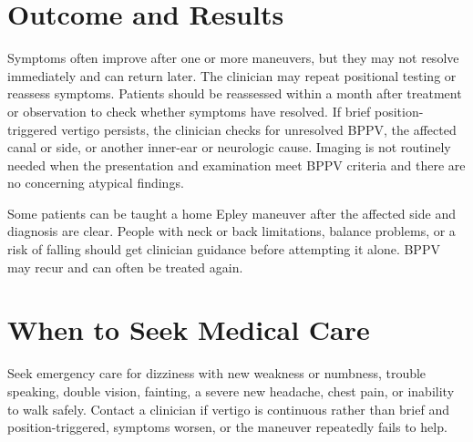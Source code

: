 \section*{Outcome and Results}
Symptoms often improve after one or more maneuvers, but they may not resolve immediately and can return later. The clinician may repeat positional testing or reassess symptoms. Patients should be reassessed within a month after treatment or observation to check whether symptoms have resolved. If brief position-triggered vertigo persists, the clinician checks for unresolved BPPV, the affected canal or side, or another inner-ear or neurologic cause. Imaging is not routinely needed when the presentation and examination meet BPPV criteria and there are no concerning atypical findings.

Some patients can be taught a home Epley maneuver after the affected side and diagnosis are clear. People with neck or back limitations, balance problems, or a risk of falling should get clinician guidance before attempting it alone. BPPV may recur and can often be treated again.

\section*{When to Seek Medical Care}
Seek emergency care for dizziness with new weakness or numbness, trouble speaking, double vision, fainting, a severe new headache, chest pain, or inability to walk safely. Contact a clinician if vertigo is continuous rather than brief and position-triggered, symptoms worsen, or the maneuver repeatedly fails to help.

